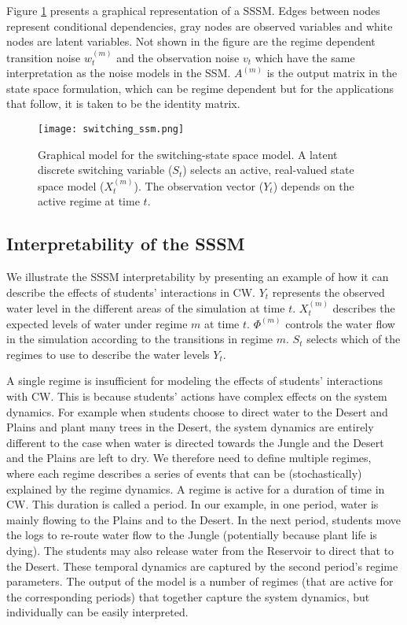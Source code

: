 Figure \ref{fig:switching_ssm} presents a graphical representation of a SSSM. Edges between nodes represent conditional dependencies, gray nodes are observed variables and white nodes are latent variables. Not shown in the figure are the regime dependent transition noise $w_t^{(m)}$ and the observation noise $v_t$ which have the same interpretation as the noise models in the SSM. $A^{(m)}$ is the output matrix in the state space formulation, which can be regime dependent but for the applications that follow, it is taken to be the identity matrix.

\begin{figure}
  \centering
  \texttt{[image: switching\_ssm.png]}
  \caption{Graphical model for the switching-state space model. A latent discrete switching variable ($S_t$) selects an active, real-valued state space model ($X^{(m)}_t$). The observation vector ($Y_t$)  depends on the active regime at time $t$.}
  \label{fig:switching_ssm}
\end{figure}

\subsection{Interpretability of the SSSM}\label{sec:interpretability_of_ssm}
We illustrate the SSSM interpretability by presenting an example of how it can describe the effects of students' interactions in CW. $Y_t$ represents the observed water level in the different areas of the simulation at time $t$. $X_t^{(m)}$ describes the expected levels of water under regime $m$ at time $t$. $\Phi^{(m)}$ controls the water flow in the simulation according to the transitions in regime $m$. $S_t$ selects which of the regimes to use to describe the water levels $Y_t$.

A single regime is insufficient for modeling the effects of students' interactions with CW. This is because students' actions have complex effects on the system dynamics. For example when students choose to direct water to the Desert and Plains and plant many trees in the Desert, the system dynamics are entirely different to the case when water is directed towards the Jungle and the Desert and the Plains are left to dry. We therefore need to define multiple regimes, where each regime describes a series of events that can be (stochastically) explained by the regime dynamics. A regime is active for a duration of time in CW. This duration is called a period. In our example, in one period, water is mainly flowing to the Plains and to the Desert. In the next period, students move the logs to re-route water flow to the Jungle (potentially because plant life is dying). The students may also release water from the Reservoir to direct that to the Desert. These temporal dynamics are captured by the second period's regime parameters. The output of the model is a number of regimes (that are active for the corresponding periods) that together capture the system dynamics, but individually can be easily interpreted.

